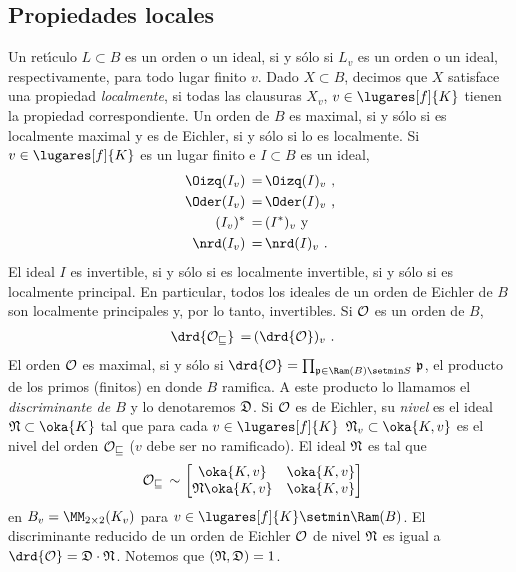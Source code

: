 \subsection{Propiedades locales}
Un ret\'{\i}culo $L\subset B$ es un orden o un ideal, si y s\'{o}lo si
$L_{v}$ es un orden o un ideal, respectivamente, para todo lugar
finito $v$. Dado $X\subset B$, decimos que $X$ satisface una propiedad
\emph{localmente},
si todas las clausuras $X_{v}$, $v\in\lugares[f]{K}$
tienen la propiedad correspondiente. Un orden de $B$ es maximal, si y
s\'{o}lo si es localmente maximal y es de Eichler, si y s\'{o}lo si
lo es localmente. Si $v\in\lugares[f]{K}$ es un lugar finito e $I\subset B$
es un ideal,
\begin{align*}
	\Oizq(I_{v}) \,=\, & \Oizq(I)_{v}\text{ ,} \\
	\Oder(I_{v}) \,=\, & \Oder(I)_{v}\text{ ,} \\
	(I_{v})^{*} \,=\, & (I^{*})_{v}\text{ y} \\
	\nrd(I_{v}) \,=\, & \nrd(I)_{v}\text{ .}
\end{align*}
%
El ideal $I$ es invertible, si y s\'{o}lo si es localmente invertible, si
y s\'{o}lo si es localmente principal. En particular, todos los ideales
de un orden de Eichler de $B$ son localmente principales y, por lo tanto,
invertibles. Si $\cal{O}$ es un orden de $B$,
\begin{align*}
	\drd{\cal{O}_{v}} \,=\, & (\drd{\cal{O}})_{v}\text{ .}
\end{align*}
%
El orden $\cal{O}$ es maximal, si y s\'{o}lo si
$\drd{\cal{O}}=\prod_{\frak{p}\in\Ram(B)\setmin S}\,\frak{p}$,
el producto de los primos (finitos)
en donde $B$ ramifica. A este producto lo llamamos el
\emph{discriminante de $B$}
y lo denotaremos $\frak{D}$.
Si $\cal{O}$ es de Eichler, su \emph{nivel}
es el ideal $\frak{N}\subset\oka{K}$ tal que para cada $v\in\lugares[f]{K}$
$\frak{N}_{v}\subset\oka{K,v}$ es el nivel del orden $\cal{O}_{v}$
($v$ debe ser no ramificado). El ideal $\frak{N}$ es tal que
\begin{align*}
	\cal{O}_{v}\,\sim\, & \begin{bmatrix} \oka{K,v} & \oka{K,v} \\
				\frak{N}\oka{K,v} & \oka{K,v}
				\end{bmatrix}
\end{align*}
%
en $B_{v}=\MM_{2\times 2}(K_{v})$ para
$v\in\lugares[f]{K}\setmin\Ram(B)$. El discriminante reducido de
un orden de Eichler $\cal{O}$ de nivel $\frak{N}$ es igual a
$\drd{\cal{O}}=\frak{D}\cdot\frak{N}$. Notemos que $(\frak{N},\frak{D})=1$.

